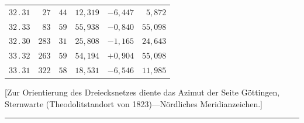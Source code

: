 \begin{center}
\begin{tabular}[t]{|c|r@{\;}r@{\;}r|r|r|}
$32\, .\, 31$ & $27$ & $44$ & $12{,}319$ & $-6{,}447$ & $5{,}872$\\
$32\, .\, 33$ & $83$ & $59$ & $55{,}938$ & $-0{,}840$ & $55{,}098$\\
$32\, .\, 30$ & $283$ & $31$ & $25{,}808$ & $-1{,}165$ & $24{,}643$\\[7pt]
$33\, .\, 32$ & $263$ & $59$ & $54{,}194$ & $+0{,}904$ & $55{,}098$\\
$33\, .\, 31$ & $322$ & $58$ & $18{,}531$ & $-6{,}546$ & $11{,}985$\\
\end{tabular}
\end{center}

[Zur Orientierung des Dreiecksnetzes diente das Azimut der Seite Göttingen,
Sternwarte (Theodolitstandort von 1823)---Nördliches Meridianzeichen.]
\begin{center}\rule{.23\linewidth}{.35pt}\end{center}
